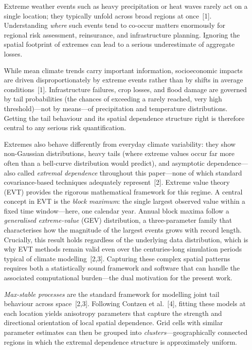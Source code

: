\documentclass[preprint,12pt,a4paper]{elsarticle}
\newcommand{\revg}[1]{{#1}}
\begin{document}
Extreme weather events such as heavy precipitation or heat waves
rarely act on a single location; they typically unfold across broad
regions at once~[1]. Understanding \emph{where} such events tend to
co-occur matters enormously for regional risk assessment, reinsurance,
and infrastructure planning. Ignoring the spatial footprint of
extremes can lead to a serious underestimate of aggregate losses.

\revg{While mean climate trends carry important information,
socioeconomic impacts are driven disproportionately by extreme events
rather than by shifts in average conditions~[1]. Infrastructure
failures, crop losses, and flood damage are governed by tail
probabilities (the chances of exceeding a rarely reached, very high
threshold)---not by means---of precipitation and temperature
distributions. Getting the tail behaviour and its spatial dependence
structure right is therefore central to any serious risk
quantification.}

\revg{Extremes also behave differently from everyday climate
variability: they show non-Gaussian distributions, heavy
tails (where extreme values occur far more often than a bell-curve
distribution would predict), and asymptotic dependence---also called
\emph{extremal dependence} throughout this paper---none of which standard
covariance-based techniques adequately represent~[2]. Extreme
value theory (EVT) provides the rigorous mathematical framework
for this regime. A central concept in EVT is the \emph{block
maximum}: the single largest observed value within a fixed time
window---here, one calendar year. Annual block maxima follow a
\emph{generalised extreme-value} (GEV) distribution, a
three-parameter family that characterises how the magnitude of the
largest events grows with record length. Crucially, this result
holds regardless of the underlying data distribution, which is why
EVT methods remain valid even over the centuries-long simulation
periods typical of climate modelling~[2,3]. Capturing these complex
spatial patterns requires both a statistically sound framework and
software that can handle the associated computational burden---the
dual motivation for the present work.}

\emph{Max-stable processes} are the standard framework for
modelling joint tail behaviour across space~[2,3].
Following Contzen et al.~[4], fitting these models at each location
yields anisotropy parameters that capture the strength and
directional orientation of local spatial dependence.
Grid cells with similar parameter estimates can then be grouped
into \emph{clusters}---geographically connected regions in which
the extremal dependence structure is approximately uniform.
\end{document}
